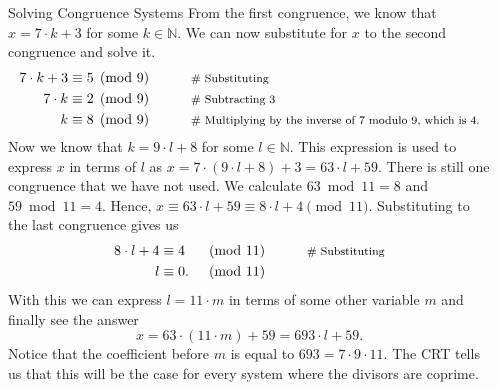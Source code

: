\documentclass[final]{beamer}
\newlength{\sepwidth}
\newlength{\colwidth}
\newcommand{\separatorcolumn}{\begin{column}{\sepwidth}\end{column}}
\newcommand{\N}{\mathbb{N}}
\begin{document}
\begin{frame}[t]
\begin{columns}[t]
\begin{column}{\colwidth}
\begin{block}{Solving Congruence Systems}
  \alert{From the first congruence}, we know that $x= 7 \cdot k +3$ for some $k
  \in \N$. We can now substitute for $x$ to the second congruence and solve it.
\begin{equation*}
   \begin{aligned}
    7 \cdot k +3 & \equiv 5 \pmod{9}  && \qquad \text{\footnotesize{\# Substituting}} \\
    7 \cdot k &\equiv 2 \pmod{9}&& \qquad \text{\footnotesize{\# Subtracting $3$}}  \\
    k &\equiv 8 \pmod{9} &&\qquad \text{\footnotesize{\# Multiplying by the
     inverse of $7$ modulo $9$, which is $4$.}}
   \end{aligned}
  \end{equation*}
 Now we know that $k = 9 \cdot l + 8$ for some $l \in \N$. This expression is
 used to express $x$ in terms of $l$ as $x = 7 \cdot (9 \cdot l+8)+3 = 63 \cdot
 l + 59$. There is still one congruence that we have not used. We calculate $63
 \bmod 11 = 8$ and $59 \bmod 11 = 4$. Hence, $x \equiv 63 \cdot l + 59 \equiv 8
 \cdot l + 4 \pmod{11}$. Substituting to the last congruence gives us
\begin{equation*}
   \begin{aligned}
    8 \cdot l + 4 & \equiv 4 & \pmod{11}  && \qquad    \text{\footnotesize{\# Substituting}} \\
    l &\equiv 0. & \pmod{11} 
   \end{aligned}
  \end{equation*}
 With this we can express $l = 11 \cdot m$ in terms of some other variable $m$
 and finally see the answer
 \[
  x = 63 \cdot (11 \cdot m) + 59 = 693 \cdot l + 59.
 \]
 Notice that the coefficient before $m$ is equal to $693 = 7\cdot 9 \cdot 11$.
 The CRT tells us that \alert{this will be the case for every system where the
 divisors are coprime}.
 \end{block}

\end{column}
\separatorcolumn

\end{columns}
\end{frame}
\end{document}
